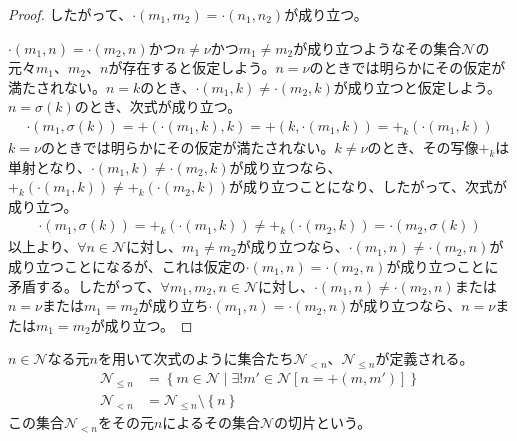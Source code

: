 \documentclass[dvipdfmx]{jsarticle}
\begin{document}
\begin{proof}
したがって、$\cdot \left( m_{1},m_{2} \right) = \cdot \left( n_{1},n_{2} \right)$が成り立つ。\par
$\cdot \left( m_{1},n \right) = \cdot \left( m_{2},n \right)$かつ$n \neq \nu$かつ$m_{1} \neq m_{2}$が成り立つようなその集合$\mathcal{N}$の元々$m_{1}$、$m_{2}$、$n$が存在すると仮定しよう。$n = \nu$のときでは明らかにその仮定が満たされない。$n = k$のとき、$\cdot \left( m_{1},k \right) \neq \cdot \left( m_{2},k \right)$が成り立つと仮定しよう。$n = \sigma(k)$のとき、次式が成り立つ。
\begin{align*}
\cdot \left( m_{1},\sigma(k) \right) = + \left( \cdot \left( m_{1},k \right),k \right) = + \left( k, \cdot \left( m_{1},k \right) \right) = +_{k}\left( \cdot \left( m_{1},k \right) \right)
\end{align*}
$k = \nu$のときでは明らかにその仮定が満たされない。$k \neq \nu$のとき、その写像$+_{k}$は単射となり、$\cdot \left( m_{1},k \right) \neq \cdot \left( m_{2},k \right)$が成り立つなら、$+_{k}\left( \cdot \left( m_{1},k \right) \right) \neq +_{k}\left( \cdot \left( m_{2},k \right) \right)$が成り立つことになり、したがって、次式が成り立つ。
\begin{align*}
\cdot \left( m_{1},\sigma(k) \right) = +_{k}\left( \cdot \left( m_{1},k \right) \right) \neq +_{k}\left( \cdot \left( m_{2},k \right) \right) = \cdot \left( m_{2},\sigma(k) \right)
\end{align*}
以上より、$\forall n \in \mathcal{N}$に対し、$m_{1} \neq m_{2}$が成り立つなら、$\cdot \left( m_{1},n \right) \neq \cdot \left( m_{2},n \right)$が成り立つことになるが、これは仮定の$\cdot \left( m_{1},n \right) = \cdot \left( m_{2},n \right)$が成り立つことに矛盾する。したがって、$\forall m_{1},m_{2},n \in \mathcal{N}$に対し、$\cdot \left( m_{1},n \right) \neq \cdot \left( m_{2},n \right)$または$n = \nu$または$m_{1} = m_{2}$が成り立ち$\cdot \left( m_{1},n \right) = \cdot \left( m_{2},n \right)$が成り立つなら、$n = \nu$または$m_{1} = m_{2}$が成り立つ。
\end{proof}
\begin{dfn}
$n \in \mathcal{N}$なる元$n$を用いて次式のように集合たち$\mathcal{N}_{< n}$、$\mathcal{N}_{\leq n}$が定義される。
\begin{align*}
\mathcal{N}_{\leq n} &= \left\{ m \in \mathcal{N} \middle| \exists!m'\in \mathcal{N}\left[ n = + \left( m,m' \right) \right] \right\}\\
\mathcal{N}_{< n} &= \mathcal{N}_{\leq n} \setminus \left\{ n \right\}
\end{align*}
この集合$\mathcal{N}_{< n}$をその元$n$によるその集合$\mathcal{N}$の切片という。
\end{dfn}
\end{document}
